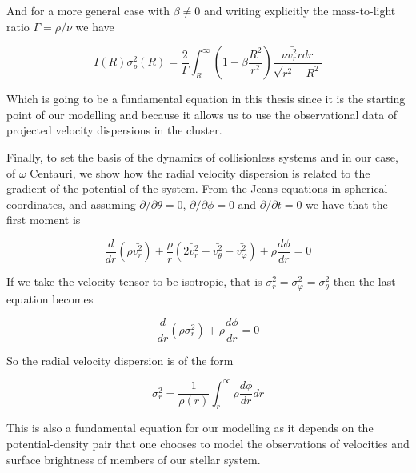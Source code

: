 And for a more general case with $\beta \neq 0$ and writing explicitly the mass-to-light ratio $\Gamma=\rho / \nu$ we have

\begin{equation}
I(R)\sigma_{p}^{2}(R)=\frac{2}{\Gamma}\int_{R}^{\infty}\left(1-\beta\frac{R^{2}}{r^{2}}\right)\frac{\nu\bar{v_{r}^{2}}rdr}{\sqrt{r^{2}-R^{2}}}
\end{equation}

Which is going to be a fundamental equation in this thesis since it is the starting point of our modelling and because it allows us to use the observational data of projected velocity dispersions in the cluster.  

Finally, to set the basis of the dynamics of collisionless systems and in our case, of $\omega$ Centauri, we show how the radial velocity dispersion is related to the gradient of the potential of the system. From the Jeans equations in spherical coordinates, and assuming $ \partial / \partial \theta=0 $, $ \partial / \partial \phi=0 $ and $ \partial / \partial t=0 $ we have that the first moment is

\begin{equation}
\frac{d}{dr}\left(\rho\bar{v_{r}^{2}}\right)+\frac{\rho}{r}\left(\bar{2v_{r}^{2}}-\bar{v_{\theta}^{2}}-\bar{v_{\varphi}^{2}}\right)+\rho\frac{d\phi}{dr}=0
\end{equation}

If we take the velocity tensor to be isotropic, that is $\sigma_{r}^{2}=\sigma_{\varphi}^{2}=\sigma_{\theta}^{2}$ then the last equation becomes

\begin{equation}
\frac{d}{dr}\left(\rho\sigma_{r}^{2}\right)+\rho\frac{d\phi}{dr}=0
\end{equation}

So the radial velocity dispersion is of the form

\begin{equation}
\sigma_{r}^{2}=\frac{1}{\rho(r)}\int_{r}^{\infty}\rho\frac{d\phi}{dr}dr
\end{equation}

This is also a fundamental equation for our modelling as it depends on the potential-density pair that one chooses to model the observations of velocities and surface brightness of members of our stellar system.